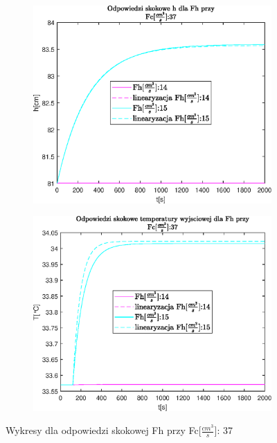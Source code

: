 \begin{figure}[h!]
   \centering
   \begin{subfigure}[b]{0.4\textwidth}
      \includegraphics[width=1\linewidth]{img/small-step-responses-fh/stepResponseHFh.eps}
      \caption{}
      \label{fig:fig:stepResponsesFh1}
   \end{subfigure}
       
   \begin{subfigure}[b]{0.4\textwidth}
      \includegraphics[width=1\linewidth]{img/small-step-responses-fh/stepResponseToutFh.eps}
      \caption{}
      \label{fig:fig:stepResponsesFh2}
   \end{subfigure}
       
   \caption{Wykresy dla odpowiedzi skokowej Fh przy Fc[$\frac{cm^3}{s}$]: 37}
   \label{fig:stepResponsesFh}
\end{figure}
           

